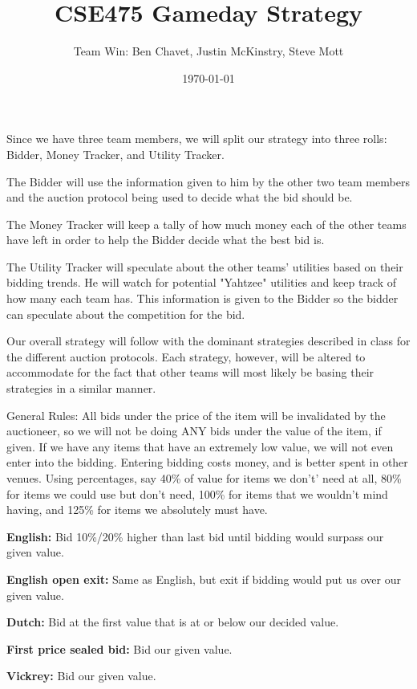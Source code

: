 \documentclass{article}
\title{CSE475 Gameday Strategy}
\author{Team Win: Ben Chavet, Justin McKinstry, Steve Mott}
\date{\today}
\begin{document}
\maketitle

Since we have three team members, we will split our strategy into three rolls:
Bidder, Money Tracker, and Utility Tracker.

The Bidder will use the information given to him by the other two team members
and the auction protocol being used to decide what the bid should be.

The Money Tracker will keep a tally of how much money each of the other teams
have left in order to help the Bidder decide what the best bid is.

The Utility Tracker will speculate about the other teams' utilities based on
their bidding trends. He will watch for potential "Yahtzee" utilities and keep
track of how many each team has. This information is given to the Bidder so the
bidder can speculate about the competition for the bid.

Our overall strategy will follow with the dominant strategies described in
class for the different auction protocols.  Each strategy, however, will be altered to accommodate for the fact that other teams will most likely be basing their strategies in a similar manner.

General Rules:
All bids under the price of the item will be invalidated by the auctioneer, so we will not be doing ANY bids under the value of the item, if given.
If we have any items that have an extremely low value, we will not even enter into the bidding.  Entering bidding costs money, and is better spent in other venues.
Using percentages, say 40\% of value for items we don't' need at all, 80\% for items we could use but don't need, 100\% for items that we wouldn't mind having, and 125\% for items we absolutely must have.

\begin{description}
  \item \textbf{English:}
    Bid 10\%/20\% higher than last bid until bidding would surpass our given value.
  \item \textbf{English open exit:}
    Same as English, but exit if bidding would put us over our given value.
  \item \textbf{Dutch:}
    Bid at the first value that is at or below our decided value.
  \item \textbf{First price sealed bid:}
    Bid our given value.
  \item \textbf{Vickrey:}
    Bid our given value.
\end{description}
\end{document}
